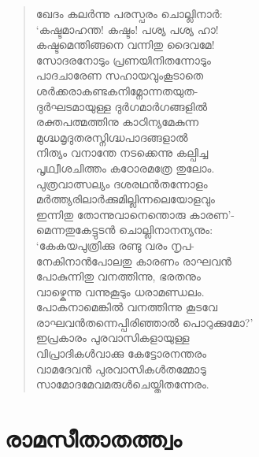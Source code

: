 \begin{verse}
ഖേദം കലര്‍ന്നു പരസ്പരം ചൊല്ലിനാര്‍:\\
‘കഷ്ടമാഹന്ത! കഷ്ടം! പശ്യ പശ്യ ഹാ!\\
കഷ്ടമെന്തിങ്ങനെ വന്നിതു ദൈവമേ!\\
സോദരനോടും പ്രണയിനിതന്നോടും\\
പാദചാരേണ സഹായവുംകൂടാതെ\\
ശര്‍ക്കരാകണ്ടകനിമ്നോന്നതയുത-\\
ദുര്‍ഘടമായുള്ള ദുര്‍ഗമാര്‍ഗങ്ങളില്‍\\
രക്തപത്മത്തിനു കാഠിന്യമേകുന്ന\\
മുഗ്ദ്ധമൃദുതരസ്നിഗ്ദ്ധപാദങ്ങളാല്‍\\
നിത്യം വനാന്തേ നടക്കെന്നു കല്പിച്ച\\
പൃഥ്വീശചിത്തം കഠോരമത്രേ തുലോം.\\
പുത്രവാത്സല്യം ദശരഥന്‍തന്നോളം\\
മര്‍ത്ത്യരിലാര്‍ക്കുമില്ലിന്നലെയോളവും\\
ഇന്നിതു തോന്നുവാനെന്തൊരു കാരണ’-\\
മെന്നതുകേട്ടുടന്‍ ചൊല്ലിനാനന്യനും:\\
‘കേകയപുത്രിക്കു രണ്ടു വരം നൃപ-\\
നേകിനാന്‍പോലതു കാരണം രാഘവന്‍\\
പോകുന്നിതു വനത്തിന്നു, ഭരതനും\\
വാഴ്കെന്നു വന്നുകൂടും ധരാമണ്ഡലം.\\
പോകനാമെങ്കില്‍ വനത്തിന്നു കൂടവേ\\
രാഘവന്‍തന്നെപ്പിരിഞ്ഞാല്‍ പൊറുക്കുമോ?’\\
ഇപ്രകാരം പുരവാസികളായുള്ള\\
വിപ്രാദികള്‍വാക്കു കേട്ടോരനന്തരം\\
വാമദേവന്‍ പുരവാസികള്‍തമ്മോടു\\
സാമോദമേവമരുള്‍ചെയ്തിതന്നേരം.
\end{verse}


\section{രാമസീതാതത്ത്വം}

